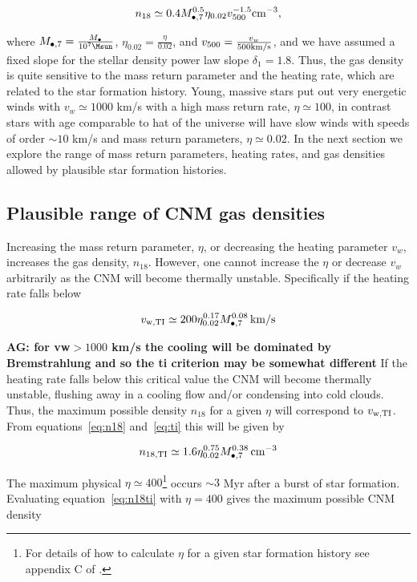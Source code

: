 \documentclass[usenatbib,fleqn]{mn2e}
\newcommand{\Mbh}[1][]{M_{\bullet#1}}
\begin{document}
\begin{equation}
n_{18}\simeq 0.4 \Mbh[,7]^{0.5} \eta_{0.02} v_{500}^{-1.5} {\rm
  cm^{-3}},
\label{eq:n18}
\end{equation}

where $\Mbh[,7]=\frac{\Mbh}{10^7 \Msun}$,
$\eta_{0.02}=\frac{\eta}{0.02}$, and $v_{500}=\frac{v_w}{500 {\rm
    km/s}}$, and we have assumed a fixed slope for the stellar density
power law slope $\delta_1=1.8$. Thus, the gas density is quite
sensitive to the mass return parameter and the heating rate, which are
related to the star formation history. Young, massive stars put out
very energetic winds with $v_w\simeq 1000$ km/s with a high mass
return rate, $\eta\simeq 100$, in contrast stars with age comparable
to hat of the universe will have slow winds with speeds of order $\sim
10$ km/s and mass return parameters, $\eta\simeq0.02$. In the next
section we explore the range of mass return parameters, heating rates,
and gas densities allowed by plausible star formation histories.

\subsection{Plausible range of CNM gas densities}
Increasing the mass return parameter, $\eta$, or decreasing the
heating parameter $v_w$, increases the gas density, $n_{18}$.
However, one cannot increase the $\eta$ or decrease $v_w$ arbitrarily
as the CNM will become thermally unstable. Specifically if the heating
rate falls below

\begin{equation}
v_{\rm w,TI}\simeq 200 \eta_{0.02}^{0.17} \Mbh[,7]^{0.08} \,{\rm km/s} 
\label{eq:ti}
\end{equation}

{\bf AG: for vw$>1000$ km/s the cooling will be dominated by
  Bremstrahlung and so the ti criterion may be somewhat different} If
the heating rate falls below this critical value the CNM will become
thermally unstable, flushing away in a cooling flow and/or condensing
into cold clouds. Thus, the maximum possible density $n_{18}$ for
a given $\eta$ will correspond to $v_{\rm w,TI}$. From
equations~\eqref{eq:n18} and~\eqref{eq:ti} this will be given by

\begin{equation}
n_{\rm 18,TI}\simeq 1.6 \eta_{0.02}^{0.75} \Mbh[,7]^{0.38} \, {\rm cm^{-3}}
\label{eq:n18ti}
\end{equation}

The maximum physical $\eta\simeq 400$\footnote{For details
  of how to calculate $\eta$ for a given star formation history see
  appendix C of \citet{Generozov+2015}.} occurs $\sim 3$ Myr after a
burst of star formation. Evaluating equation~\eqref{eq:n18ti} with
$\eta=400$ gives the maximum possible CNM density
\end{document}
